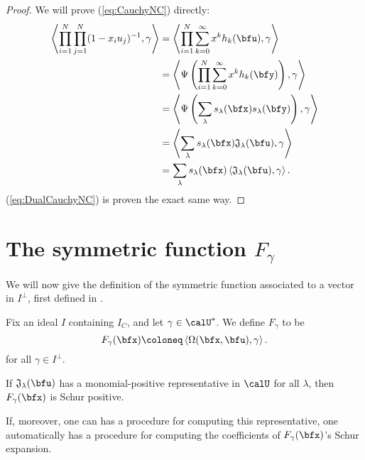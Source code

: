 \documentclass{article}
\newcommand{\ip}[1]{
    \left\langle
        {#1}
    \right\rangle
}
\newcommand*\frkJ{\mathfrak{J}}
\begin{document}
\begin{proof}
    We will prove (\ref{eq:CauchyNC}) directly:
    \begin{align*}
        \ip{
            \prod_{i=1}^N
            \prod_{j=1}^N
            (1 - x_iu_j)^{-1},
            \gamma
        }
        &=
        \ip{
            \prod_{i=1}^N
            \sum_{k=0}^\infty
            x^kh_k(\bfu),
            \gamma
        }
        \\
        &=
        \ip{
            \Psi\left(
                \prod_{i=1}^N
                \sum_{k=0}^\infty
                x^kh_k(\bfy)
            \right),
            \gamma
        }
        \\
        &=
        \ip{
            \Psi\left(
                \sum_\lambda
                s_\lambda(\bfx)
                s_\lambda(\bfy)
            \right),
            \gamma
        }
        \\
        &=
        \ip{
            \sum_\lambda
            s_\lambda(\bfx)
            \frkJ_\lambda(\bfu),
            \gamma
        }
        \\
        &=
        \sum_\lambda
        s_\lambda(\bfx)
        \ip{\frkJ_\lambda(\bfu),\gamma}.
    \end{align*}
    (\ref{eq:DualCauchyNC}) is proven the exact same way.
\end{proof}


\section{
    The symmetric function $F_\gamma$
}

We will now give the definition of the symmetric function associated to a vector in $I^\perp$, first defined in \cite{FG98}.

\begin{definition}
    Fix an ideal $I$ containing $I_C$, and let $\gamma \in \calU^\ast$.
    We define $F_\gamma$ to be 
    \[
        F_\gamma(\bfx)
        \coloneq
        \ip{\Omega(\bfx,\bfu),\gamma}.
    \]
    for all $\gamma \in I^\perp$.
\end{definition}

\begin{definition}
\end{definition}

\begin{theorem}
    If $\frkJ_\lambda(\bfu)$ has a monomial-positive representative in $\calU$ for all $\lambda$, then $F_\gamma(\bfx)$ is Schur positive.

    If, moreover, one can has a procedure for computing this representative, one automatically has a procedure for computing the coefficients of $F_\gamma(\bfx)$'s Schur expansion.
\end{theorem}
\end{document}
